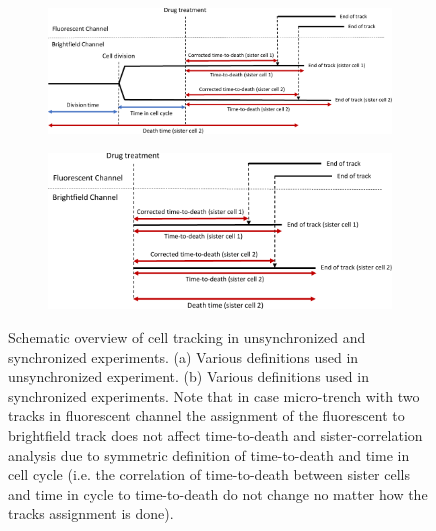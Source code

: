 \documentclass[pdftex,12pt,a4paper]{report}
\begin{document}
\begin{figure}[H]

\centering

\begin{subfigure}{\textwidth}
  \centering
  \includegraphics[width=\textwidth]{images/cell_death_def_unsyn.pdf}
  \caption{}
  \label{fig:cell_death_def_unsyn}
\end{subfigure}%

\begin{subfigure}{.75\textwidth}
  \centering
  \includegraphics[width=\textwidth]{images/cell_death_def_syn_2.pdf}
  \caption{}
  \label{fig:cell_death_def_syn_2}
\end{subfigure}%

\caption[Definition of terms in time-to-death analysis and sisters death time correlation analysis]{Schematic overview of cell tracking in unsynchronized and synchronized experiments. (a) Various definitions used in unsynchronized experiment. (b) Various definitions used in synchronized experiments. Note that in case micro-trench with two tracks in fluorescent channel the assignment of the fluorescent to brightfield track does not affect time-to-death and sister-correlation analysis due to symmetric definition of time-to-death and time in cell cycle (i.e. the correlation of time-to-death between sister cells and time in cycle to time-to-death do not change no matter how the tracks assignment is done).}

\label{fig:cell_death_def}
\end{figure}
\end{document}
